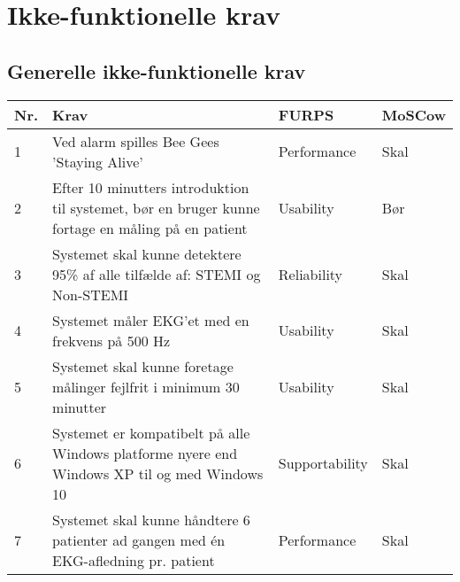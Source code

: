 \section{Ikke-funktionelle krav}
\subsection{Generelle ikke-funktionelle krav}
\begin{table}[H]
\begin{tabular}{|p{0.5cm}|p{6cm}|p{3cm}|p{3cm}|}
\hline
\textbf{Nr.} & \textbf{Krav} & \textbf{FURPS}& \textbf{MoSCow} \\\hline
 1 &  Ved alarm spilles Bee Gees 'Staying Alive' & Performance & Skal \\\hline
 2 & Efter 10 minutters introduktion til systemet, bør en bruger kunne fortage en måling på en patient & Usability  & Bør \\\hline
 3 & Systemet skal kunne detektere 95\% af alle tilfælde af: STEMI og Non-STEMI & Reliability  & Skal \\\hline
 4 & Systemet måler EKG'et med en frekvens på 500 Hz & Usability & Skal \\\hline
 5 & Systemet skal kunne foretage målinger fejlfrit i minimum 30 minutter & Usability & Skal \\\hline
 6 & Systemet er kompatibelt på alle Windows platforme nyere end Windows XP til og med Windows 10 & Supportability & Skal \\\hline
 7 & Systemet skal kunne håndtere 6 patienter ad gangen med én EKG-afledning pr. patient & Performance & Skal \\\hline 
\end{tabular}
\end{table}

